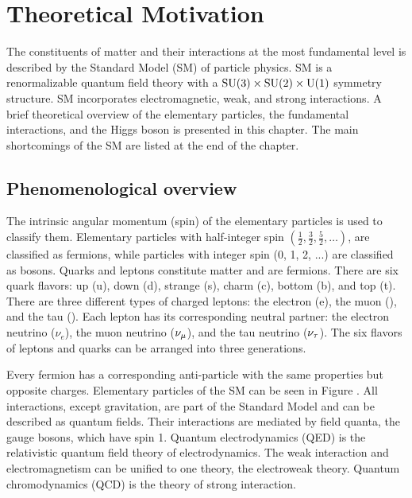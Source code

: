 %
%

\chapter{Theoretical Motivation}
\label{chap:theory}

The constituents of matter and their interactions at the most fundamental level is described by the Standard Model (SM) of particle physics. SM is a renormalizable quantum field theory with a $\text{SU}(3) \times \text{SU}(2) \times \text{U}(1)$ symmetry structure. SM incorporates electromagnetic, weak, and strong interactions. A brief theoretical overview of the elementary particles, the fundamental interactions, and the Higgs boson is presented in this chapter. The main shortcomings of the SM are listed at the end of the chapter.

\section{Phenomenological overview}

The intrinsic angular momentum (spin) of the elementary particles is used to classify them. Elementary particles with half-integer spin $(\frac{1}{2}, \frac{3}{2}, \frac{5}{2}, \ldots)$, are classified as fermions, while particles with integer spin (0, 1, 2, ...) are classified as bosons. Quarks and leptons constitute matter and are fermions. There are six quark flavors: up (u), down (d), strange (s), charm (c), bottom (b), and top (t). There are three different types of charged leptons: the electron (e), the muon (\Pgm), and the tau (\Pgt). Each lepton has its corresponding neutral partner: the electron neutrino ($\nu_{e}$), the muon neutrino ($\nu_{\mu}$), and the tau neutrino ($\nu_{\tau}$). The six flavors of leptons and quarks can be arranged into three generations.

Every fermion has a corresponding anti-particle with the same properties but opposite charges. Elementary particles of the SM can be seen in Figure \cite{fig:sm_particles}. All interactions, except gravitation, are part of the Standard Model and can be described as quantum fields. Their interactions are mediated by field quanta, the gauge bosons, which have spin 1. Quantum electrodynamics (QED) is the relativistic quantum field theory of electrodynamics. The weak interaction and electromagnetism can be unified to one theory, the electroweak theory. Quantum chromodynamics (QCD) is the theory of strong interaction.

